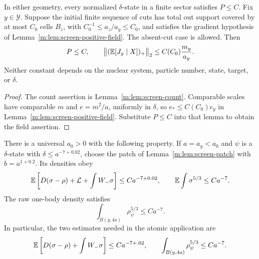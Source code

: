 \begin{proposition}
\label{a:prop:screen-local}
In either geometry, every normalized $\delta$-state in a finite sector
satisfies $P\le C$.  Fix $y\in\mathcal Y$.  Suppose the initial
finite sequence of cuts has total out support covered by at most
$C_0$ cells $B_z$, with $C_0^{-1}\le a_z/a_y\le C_0$, and satisfies
the gradient hypothesis of Lemma~\ref{m:lem:screen-positive-field}.
The absent-cut case is allowed.  Then
\begin{equation}\label{a:eq:screen-local}
 P\le C,\qquad
 \big\|(\mathbb E[J_y\mid X])_+\big\|_2
             \le C(C_0)\frac{m_y}{a_y}.
\end{equation}
Neither constant depends on the nuclear system, particle number,
state, target, or $\delta$.
\end{proposition}

\begin{proof}
The count assertion is Lemma~\ref{m:lem:screen-count}.
Comparable scales have comparable $m$ and $e=m^2/a$, uniformly in
$\delta$, so $e_*\le C(C_0)e_y$ in
Lemma~\ref{m:lem:screen-positive-field}.  Substitute $P\le C$
into that lemma to obtain the field assertion.
\end{proof}

\begin{lemma}\label{m:lem:screen-density}\label{a:cor:screen-refined}
There is a universal $a_0>0$ with the following property.  If
$a=a_y<a_0$ and $\psi$ is a $\delta$-state with
$\delta\le a^{-7+0.02}$, choose the patch of
Lemma~\ref{m:lem:screen-patch} with $b=a^{1+0.2}$.  Its densities obey
\begin{equation}\label{m:eq:screen-fine-error}
 \mathbb E\left[D(\sigma-\rho)+\mathcal L+\int W_-\sigma\right]
       \le Ca^{-7+0.02},\qquad
 \mathbb E\int\sigma^{5/3}\le Ca^{-7}.
\end{equation}
The raw one-body density satisfies
\begin{equation}\label{m:eq:screen-density}
 \int_{B(y,4a)}\rho_\psi^{5/3}\le Ca^{-7}.
\end{equation}
In particular, the two estimates needed in the atomic application are
\begin{equation}\label{a:eq:screen-refined}
 \mathbb E\left[D(\sigma-\rho)+\int W_-\sigma\right]\le Ca^{-7+.02},
 \qquad \int_{B(y,4a)}\rho_\psi^{5/3}\le Ca^{-7}.
\end{equation}
\end{lemma}

